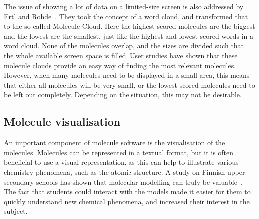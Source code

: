 The issue of showing a lot of data on a limited-size screen is also addressed by Ertl and Rohde~\cite{ertl2012molecule}. They took the concept of a word cloud, and transformed that to the so called Molecule Cloud. Here the highest scored molecules are the biggest and the lowest are the smallest, just like the highest and lowest scored words in a word cloud. None of the molecules overlap, and the sizes are divided such that the whole available screen space is filled. User studies have shown that these molecule clouds provide an easy way of finding the most relevant molecules. However, when many molecules need to be displayed in a small area, this means that either all molecules will be very small, or the lowest scored molecules need to be left out completely. Depending on the situation, this may not be desirable.

\subsection{Molecule visualisation}
An important component of molecule software is the visualisation of the molecules. Molecules can be represented in a textual format, but it is often beneficial to use a visual representation, as this can help to illustrate various chemistry phenomena, such as the atomic structure. A study on Finnish upper secondary schools has shown that molecular modelling can truly be valuable~\cite{aksela2008computer}. The fact that students could interact with the models made it easier for them to quickly understand new chemical phenomena, and increased their interest in the subject.


